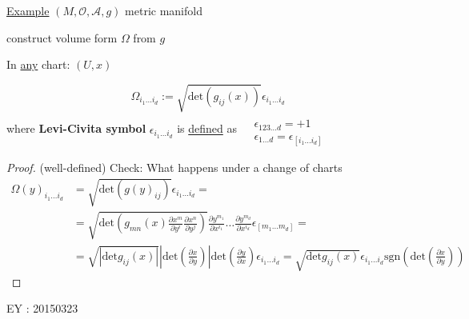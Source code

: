 \documentclass[10pt, twoside]{amsart}
\begin{document}
\begin{multicols*}{2}
\underline{Example} $(M,\mathcal{O}, \mathcal{A},g)$ metric manifold

construct volume form $\Omega$ from $g$

In \underline{any} chart: $(U,x)$

\[
\Omega_{i_1 \dots i_d} := \sqrt{ \text{det}(g_{ij}(x)) } \epsilon_{i_1 \dots i_d} 
\]
where \textbf{Levi-Civita symbol} $\epsilon_{i_1 \dots i_d}$ is \underline{defined} as $\begin{aligned} & \quad \\ 
& \epsilon_{123 \dots d} = +1 \\ 
& \epsilon_{1\dots d} = \epsilon_{[i_1 \dots i_d]} \end{aligned}$

\begin{proof} (well-defined) Check: What happens under a change of charts
\[
\begin{aligned}
\Omega(y)_{i_1 \dots i_d} & = \sqrt{ \text{det}(g(y)_{ij}) } \epsilon_{i_1 \dots i_d} = \\
& = \sqrt{ \text{det}(g_{mn}(x) \frac{ \partial x^m}{ \partial y^i} \frac{ \partial x^n}{ \partial y^j} )} \frac{ \partial y^{m_1} }{ \partial x^{i_1} } \dots \frac{ \partial y^{m_d}}{ \partial x^{i_d}} \epsilon_{ [m_1 \dots m_d] } = \\
& = \sqrt{ | \text{det}g_{ij}(x) | } \left| \text{det}\left( \frac{ \partial x}{ \partial y} \right) \right| \text{det}\left( \frac{ \partial y}{ \partial x} \right) \epsilon_{i_1 \dots i_d} = \sqrt{ \text{det}g_{ij}(x)} \epsilon_{i_1 \dots i_d} \text{sgn}\left( \text{det}\left( \frac{ \partial x}{ \partial y} \right) \right)
\end{aligned}
\]
\end{proof}

EY : 20150323 


\end{multicols*}
\end{document}
